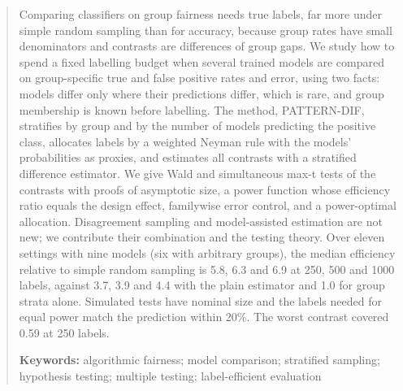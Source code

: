 \begin{abstract}
Comparing classifiers on group fairness needs true labels, far more under simple random sampling than for accuracy, because group rates have small denominators and contrasts are differences of group gaps. We study how to spend a fixed labelling budget when several trained models are compared on group-specific true and false positive rates and error, using two facts: models differ only where their predictions differ, which is rare, and group membership is known before labelling. The method, PATTERN-DIF, stratifies by group and by the number of models predicting the positive class, allocates labels by a weighted Neyman rule with the models' probabilities as proxies, and estimates all contrasts with a stratified difference estimator. We give Wald and simultaneous max-t tests of the contrasts with proofs of asymptotic size, a power function whose efficiency ratio equals the design effect, familywise error control, and a power-optimal allocation. Disagreement sampling and model-assisted estimation are not new; we contribute their combination and the testing theory. Over eleven settings with nine models (six with arbitrary groups), the median efficiency relative to simple random sampling is 5.8, 6.3 and 6.9 at 250, 500 and 1000 labels, against 3.7, 3.9 and 4.4 with the plain estimator and 1.0 for group strata alone. Simulated tests have nominal size and the labels needed for equal power match the prediction within 20\%. The worst contrast covered 0.59 at 250 labels.

\medskip\noindent\textbf{Keywords:} algorithmic fairness; model comparison; stratified sampling; hypothesis testing; multiple testing; label-efficient evaluation
\end{abstract}
